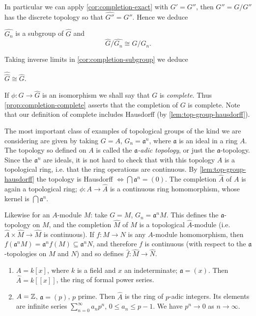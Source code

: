 In particular we can apply \eqref{cor:completion-exact} with $G' = G''$, then $G'' = G/G''$ has the discrete topology so that $\widehat{G''} = G''$. Hence we deduce

\begin{corollary}\label{cor:completion-subgroup}
$\widehat{G_n}$ is a subgroup of $\widehat{G}$ and
\[
    \widehat{G}/\widehat{G_n} \cong G/G_n.
\]
\end{corollary}

Taking inverse limits in \eqref{cor:completion-subgroup} we deduce

\begin{proposition}\label{prop:completion-complete}
$\widehat{\widehat{G}} \cong \widehat{G}$.
\end{proposition}

If $\phi \colon G \to \widehat{G}$ is an isomorphism we shall say that $G$ is \emph{complete}. Thus \eqref{prop:completion-complete} asserts that the completion of $G$ is complete. Note that our definition of complete includes Hausdorff (by \eqref{lem:top-group-hausdorff}).

The most important class of examples of topological groups of the kind we are considering are given by taking $G = A$, $G_n = \mathfrak{a}^n$, where $\mathfrak{a}$ is an ideal in a ring $A$. The topology so defined on $A$ is called the \emph{$\mathfrak{a}$-adic topology}, or just the $\mathfrak{a}$-topology. Since the $\mathfrak{a}^n$ are ideals, it is not hard to check that with this topology $A$ is a topological ring, i.e. that the ring operations are continuous. By \eqref{lem:top-group-hausdorff} the topology is Hausdorff $\iff \bigcap \mathfrak{a}^n = (0)$. The completion $\widehat{A}$ of $A$ is again a topological ring; $\phi \colon A \to \widehat{A}$ is a continuous ring homomorphism, whose kernel is $\bigcap \mathfrak{a}^n$.

Likewise for an $A$-module $M$: take $G = M$, $G_n = \mathfrak{a}^n M$. This defines the $\mathfrak{a}$-topology on $M$, and the completion $\widehat{M}$ of $M$ is a topological $\widehat{A}$-module (i.e. $\widehat{A} \times \widehat{M} \to \widehat{M}$ is continuous). If $f \colon M \to N$ is any $A$-module homomorphism, then $f(\mathfrak{a}^n M) = \mathfrak{a}^n f(M) \subseteq \mathfrak{a}^n N$, and therefore $f$ is continuous (with respect to the $\mathfrak{a}$-topologies on $M$ and $N$) and so defines $\widehat{f} \colon \widehat{M} \to \widehat{N}$.

\begin{examples}
\begin{enumerate}[1)]
    \item $A = k[x]$, where $k$ is a field and $x$ an indeterminate; $\mathfrak{a} = (x)$. Then $\widehat{A} = k[[x]]$, the ring of formal power series.
    
    \item $A = \mathbb{Z}$, $\mathfrak{a} = (p)$, $p$ prime. Then $\widehat{A}$ is the ring of $p$-adic integers. Its elements are infinite series $\sum_{n=0}^\infty a_n p^n$, $0 \leq a_n \leq p - 1$. We have $p^n \to 0$ as $n \to \infty$.
\end{enumerate}
\end{examples}

